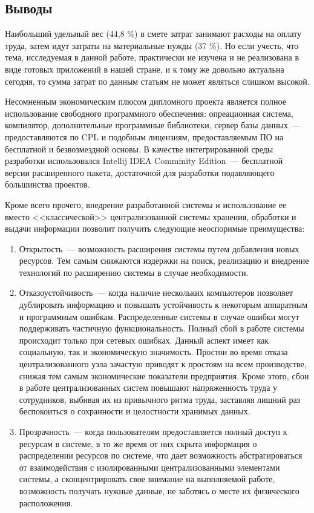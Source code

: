 \subsection*{Выводы}
Наибольший удельный вес (44,8 \%) в смете затрат занимают расходы на оплату труда, затем идут затраты на материальные нужды (37 \%). Но если учесть, что тема, исследуемая в данной работе, практически не изучена и не реализована в виде готовых приложений в нашей стране, и к тому же довольно актуальна сегодня, то сумма затрат по данным статьям не может являться слишком высокой.

Несомненным экономическим плюсом дипломного проекта является полное использование свободного программного обеспечения: опреационная система, компилятор, дополнительные программные библиотеки, сервер базы данных~--- предоставляются по CPL и подобным лицензиям, предоставляемым ПО на бесплатной и безвозмездной основы. В качестве интегрированной среды разработки использовался Intellij IDEA Comminity Edition~--- бесплатной версии расширенного пакета, достаточной для разработки подавляющего большинства проектов.

Кроме всего прочего, внедрение разработанной системы и использование ее вместо <<классической>> централизованной системы хранения, обработки и выдачи информации позволит получить следующие неоспоримые преимущества:

\begin{enumerate}
\item Открытость~--- возможность расширения системы путем добавления новых ресурсов. Тем самым снижаются издержки на поиск, реализацию и внедрение технологий по расширению системы в случае необходимости.
\item Отказоустойчивость~--- когда наличие нескольких компьютеров позволяет дублировать информацию и повышать устойчивость к некоторым аппаратным и программным ошибкам. Распределенные системы в случае ошибки могут поддерживать частичную функциональность. Полный сбой в работе системы происходит только при сетевых ошибках.
Данный аспект имеет как социальную, так и экономическую значимость. Простои во время отказа централизованного узла зачастую приводят к простоям на всем производстве, снижая тем самым экономические показатели предприятия. Кроме этого, сбои в работе централизованных систем повышают напряженность труда у сотрудников, выбивая их из привычного ритма труда, заставляя лишний раз беспокоиться о сохранности и целостности хранимых данных.
\item Прозрачность~--- когда пользователям предоставляется полный доступ к ресурсам в системе, в то же время от них скрыта информация о распределении ресурсов по системе, что дает возможность абстрагироваться от взаимодействия с изолированными централизованными элементами системы, а сконцентрировать свое внимание на выполняемой работе, возможность получать нужные данные, не заботясь о месте их физического расположения.
\end{enumerate}


